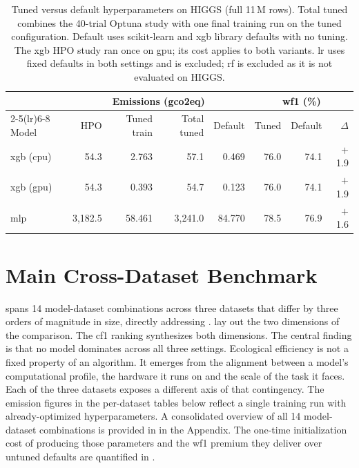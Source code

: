 \begin{table}[htbp]
\centering
\caption[Tuned versus default hyperparameters on HIGGS (11\,M rows).]{Tuned versus default hyperparameters on HIGGS (full 11\,M rows). Total tuned combines the 40-trial Optuna study with one final training run on the tuned configuration. Default uses scikit-learn and \gls{xgb} library defaults with no tuning. The \gls{xgb} HPO study ran once on \gls{gpu}; its cost applies to both variants. \gls{lr} uses fixed defaults in both settings and is excluded; \gls{rf} is excluded as it is not evaluated on HIGGS.}
\label{tab:tuned_vs_default}
\small
\begin{tabular}{@{} l r r r r r r r @{}}
\toprule
 & \multicolumn{4}{c}{Emissions (\gls{gco2eq})} & \multicolumn{3}{c}{\gls{wf1} (\%)} \\
\cmidrule(lr){2-5}\cmidrule(lr){6-8}
Model & HPO & Tuned train & Total tuned & Default & Tuned & Default & $\Delta$ \\
\midrule
\gls{xgb} (\gls{cpu}) &    54.3 &  2.763 &    57.1 &  0.469 & 76.0 & 74.1 & $+$1.9 \\
\gls{xgb} (\gls{gpu}) &    54.3 &  0.393 &    54.7 &  0.123 & 76.0 & 74.1 & $+$1.9 \\
\gls{mlp}           & 3{,}182.5 & 58.461 & 3{,}241.0 & 84.770 & 78.5 & 76.9 & $+$1.6 \\
\bottomrule
\end{tabular}
\end{table}


\section{Main Cross-Dataset Benchmark}
\label{sec:results_main}

 spans 14 model-dataset combinations across three datasets that differ by three orders of magnitude in size, directly addressing .  lay out the two dimensions of the comparison. The \gls{cf1} ranking synthesizes both dimensions. The central finding is that no model dominates across all three settings. Ecological efficiency is not a fixed property of an algorithm. It emerges from the alignment between a model's computational profile, the hardware it runs on and the scale of the task it faces. Each of the three datasets exposes a different axis of that contingency. The emission figures in the per-dataset tables below reflect a single training run with already-optimized hyperparameters. A consolidated overview of all 14 model-dataset combinations is provided in  in the Appendix. The one-time initialization cost of producing those parameters and the \gls{wf1} premium they deliver over untuned defaults are quantified in .


